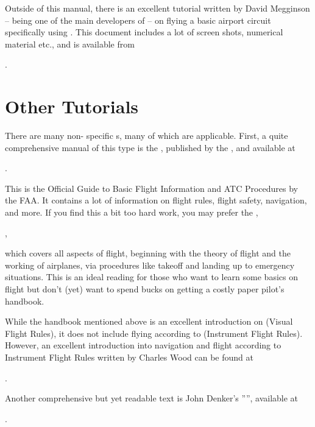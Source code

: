 Outside of this manual, there is an excellent tutorial written by David
Megginson  -- being one of the main developers
of \FlightGear{} -- on flying a basic airport circuit specifically
using \FlightGear{}. This document includes a lot of screen shots,
numerical material etc., and is available from

\medskip
{}.
\medskip

\section{Other Tutorials}

There are many non-\FlightGear{} specific s, many of which are 
applicable. First, a quite comprehensive manual of this type is the 
, published by the , 
and available at

\medskip
{}.
\medskip
\noindent

This is the Official Guide to Basic Flight Information and ATC Procedures by 
the FAA. It contains a lot of information on flight rules, flight safety, 
navigation, and more. If you find this a bit too hard work, you may prefer 
the ,

\medskip
{},
\medskip
\noindent

which covers all aspects of flight, beginning with the theory of flight and the
working of airplanes, via procedures like takeoff and landing up to emergency 
situations. This is an ideal reading for those who want to learn some basics on 
flight but don't (yet) want to spend bucks on getting a costly paper pilot's 
handbook.

While the handbook mentioned above is an excellent introduction on  
(Visual Flight Rules), it does not include flying according to  
(Instrument Flight Rules). However, an excellent introduction into navigation 
and flight according to Instrument Flight Rules written by Charles Wood
 can be found at

.

Another comprehensive but yet readable text is John Denker's
'''', available at
\medskip

.
\medskip

